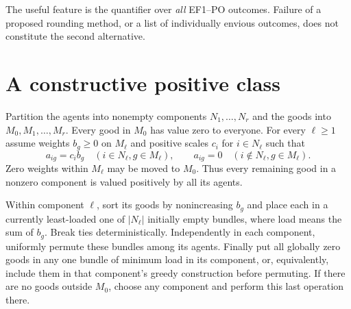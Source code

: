 \documentclass[11pt]{article}
\theoremstyle{definition}
\begin{document}
The useful feature is the quantifier over \emph{all} EF1--PO outcomes.
Failure of a proposed rounding method, or a list of individually envious
outcomes, does not constitute the second alternative.

\section{A constructive positive class}
Partition the agents into nonempty components $N_1,\ldots,N_r$ and the
goods into $M_0,M_1,\ldots,M_r$. Every good in $M_0$ has value zero to
everyone. For every $\ell\ge1$ assume weights $b_g\ge0$ on $M_\ell$ and
positive scales $c_i$ for $i\in N_\ell$ such that
\[
 a_{ig}=c_i b_g\quad(i\in N_\ell,g\in M_\ell),\qquad
 a_{ig}=0\quad(i\notin N_\ell,g\in M_\ell).
\]
Zero weights within $M_\ell$ may be moved to $M_0$. Thus every remaining
good in a nonzero component is valued positively by all its agents.

Within component $\ell$, sort its goods by nonincreasing $b_g$ and place
each in a currently least-loaded one of $|N_\ell|$ initially empty bundles,
where load means the sum of $b_g$. Break ties deterministically.
Independently in each component, uniformly permute these bundles among
its agents. Finally put all globally zero goods in any one bundle of
minimum load in its component, or, equivalently, include them in that
component's greedy construction before permuting. If there are no goods
outside $M_0$, choose any component and perform this last operation there.
\end{document}
